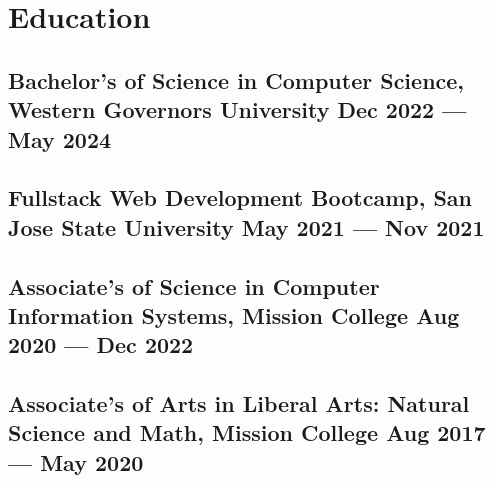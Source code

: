 \documentclass[a4,10pt]{article}
\newenvironment{zitemize}{
\begin{itemize}\itemsep0pt \parskip0pt \parsep1pt}
{\end{itemize}\vspace{-0.5cm}}
\begin{document}
\section{Education}
\subsection*{Bachelor's of Science in Computer Science, {\normalsize \normalfont Western Governors University} \hfill Dec 2022 --- May 2024} 
\vspace{0.2cm}
\subsection*{Fullstack Web Development Bootcamp, {\normalsize \normalfont San Jose State University} \hfill May 2021 --- Nov 2021} 
\vspace{0.2cm}
\subsection*{Associate's of Science in Computer Information Systems, {\normalsize \normalfont Mission College} \hfill Aug 2020 --- Dec 2022} 
\vspace{0.2cm}
\subsection*{Associate's of Arts in Liberal Arts: Natural Science and Math, {\normalsize \normalfont Mission College} \hfill Aug 2017 --- May 2020} 
\vspace{0.2cm}
{\hfill}




\end{document}
